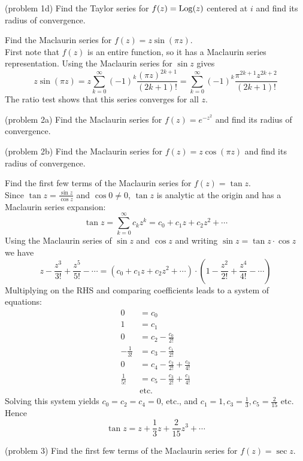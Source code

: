 \documentclass[handout]{ximera}
\begin{document}
\begin{problem}(problem 1d)
Find the Taylor series for $f(z) = \operatorname{Log}(z)$ centered at $i$ and find its radius of convergence.
\end{problem}


\begin{example}[example 2]
Find the Maclaurin series for $f(z) = z\sin(\pi z)$.\\
First note that $f(z)$ is an entire function, so it has a Maclaurin series representation.
Using the Maclaurin series for $\sin z$ gives
\[
z\sin(\pi z) = z\sum_{k=0}^\infty (-1)^k \frac{(\pi z)^{2k+1}}{(2k+1)!} = \sum_{k=0}^\infty (-1)^k \frac{\pi^{2k+1} z^{2k+2}}{(2k+1)!}
\]
The ratio test shows that this series converges for all $z$.
\end{example}

\begin{problem}(problem 2a)
Find the Maclaurin series for $f(z) = e^{-z^2}$ and find its radius of convergence.
\end{problem}

\begin{problem}(problem 2b)
Find the Maclaurin series for $f(z) = z\cos(\pi z)$ and find its radius of convergence.
\end{problem}

\begin{example}[example 3]
Find the first few terms of the Maclaurin series for $f(z) = \tan z$.\\
Since $\tan z = \frac{\sin z}{\cos z}$ and $\cos 0 \neq 0$, $\tan z$ is analytic at the origin 
and has a Maclaurin series expansion:
\[
\tan z = \sum_{k=0}^\infty c_k z^k = c_0 + c_1 z + c_2 z^2 + \cdots
\]
Using the Maclaurin series of $\sin z$ and $\cos z$ and writing $\sin z = \tan z \cdot \cos z$ we have
\[
z-\frac{z^3}{3!} + \frac{z^5}{5!} - \cdots = \left(c_0 + c_1 z + c_2 z^2 + \cdots\right) \cdot \left(1-\frac{z^2}{2!} + \frac{z^4}{4!} - \cdots \right)
\]
Multiplying on the RHS and comparing coefficients leads to a system of equations:
\begin{align*}
0 & = c_0 \\
1 & = c_1 \\
0 & = c_2 -\frac{c_0}{2!} \\
-\frac{1}{3!} & =  c_3- \frac{c_1}{2!} \\
0 & = c_4 - \frac{c_2}{2!} +  \frac{c_0}{4!} \\
 \frac{1}{5!} & = c_5- \frac{c_3}{2!} +  \frac{c_1}{4!}\\
 & \text{etc.}
\end{align*}
Solving this system yields $c_0 = c_2 = c_4 = 0$, etc., and  $c_1 = 1, c_3 = \frac13, c_5 = \frac{2}{15}$ etc.
Hence 
\[
\tan z = z + \frac13 z + \frac{2}{15}z^3 + \cdots
\]
\end{example}

\begin{problem}(problem 3)
Find the first few terms of the Maclaurin series for $f(z) = \sec z$.
\end{problem}
\end{document}
